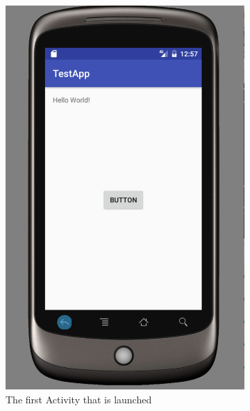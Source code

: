 \begin{figure}[H]%
\centering
    \begin{subfigure}[b]{0.45\textwidth}
        \includegraphics[width=\textwidth]{images/launching_activities_1}
        \caption{The first Activity that is launched}
        \label{fig:launching_activities_1}
    \end{subfigure}
    ~ 
    \begin{subfigure}[b]{0.45\textwidth}

\end{subfigure}
\end{figure}
